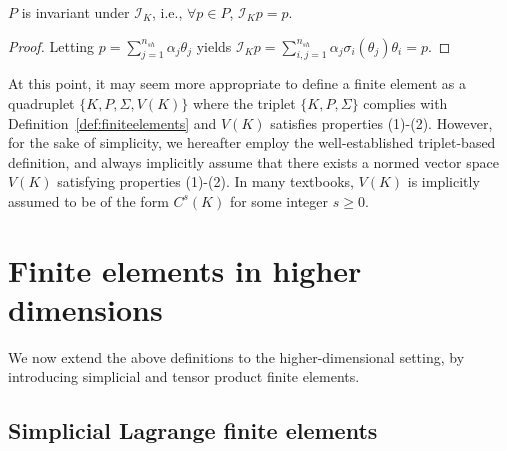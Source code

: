 \begin{lemma}\label{lemma:P_invariant_under_IK}
    $P$ is invariant under $\mathcal{I}_K$, i.e., $\forall p \in P$, $\mathcal{I}_K p = p$.
    \begin{proof}
        Letting $p = \sum_{j=1}^{n_{sh}} \alpha_j \theta_j$ yields $\mathcal{I}_K p = \sum_{i,j=1}^{n_{sh}} \alpha_j \sigma_i(\theta_j) \theta_i = p$.
    \end{proof}
\end{lemma}


At this point, it may seem more appropriate to define a finite element as a quadruplet $\{K, P, \Sigma, V(K)\}$ where the triplet $\{K, P, \Sigma\}$ complies with Definition~\ref{def:finiteelements} and $V(K)$ satisfies properties (1)-(2). However, for the sake of simplicity, we hereafter employ the well-established triplet-based definition, and always implicitly assume that there exists a normed vector space $V(K)$ satisfying properties (1)-(2). In many textbooks, $V(K)$ is implicitly assumed to be of the form $C^s(K)$ for some integer $s \ge 0$.
\section{Finite elements in higher dimensions}
We now extend the above definitions to the higher-dimensional setting, by introducing simplicial and tensor product finite elements.
\subsection{Simplicial Lagrange finite elements}
